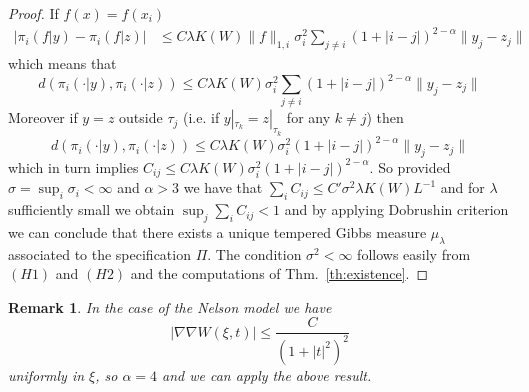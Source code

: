 \documentclass[a4paper,12pt,reqno]{amsart}
\newtheorem{corollary}[theorem]{Corollary}
\newtheorem{remark}[theorem]{Remark}
\begin{document}
\begin{proof}
If $f(x) = f(x_i)$
\begin{equation*}
  \begin{split}
 \left|\pi_i(f|y)-\pi_i(f|z)\right| & \le 
 C \lambda K(W)  \|f\|_{1,i}  \sigma_i^2 \sum_{j \neq i} 
   (1+|i-j|)^{2-\alpha}  \|y_j-z_j\| 
  \end{split}
\end{equation*}
which means that
\begin{equation}
d(\pi_i(\cdot|y),\pi_i(\cdot|z)) \le C\lambda K(W)   \sigma_i^2   \sum_{j \neq i} 
   (1+|i-j|)^{2-\alpha}  \|y_j-z_j\|  
\end{equation}
Moreover if $y=z$ outside $\tau_j$ (i.e. if $y|_{\tau_k} = z|_{\tau_k}$ for any $k \neq j$) then 
\begin{equation}
d(\pi_i(\cdot|y),\pi_i(\cdot|z)) \le C \lambda K(W) \sigma_i^2    
   (1+|i-j|)^{2-\alpha}  \|y_j-z_j\|  
\end{equation}
which in turn implies
$
C_{ij} \le C  \lambda K(W)  \sigma_i^2 
   (1+|i-j|)^{2-\alpha}.  
$
So provided 
$
\sigma = \sup_i \sigma_i < \infty 
$
and $\alpha > 3$
we have that $\sum_i C_{ij} \le C' \sigma^2 \lambda K(W) L^{-1}$ and for $\lambda$ sufficiently small we obtain $\sup_j \sum_{i} C_{ij} < 1$ and by applying Dobrushin criterion we can conclude that
 there exists a unique
tempered Gibbs measure $\mu_\lambda$ associated to the specification $\Pi$.
The condition $\sigma^2 < \infty$ follows easily from $(H1)$ and $(H2)$ and the computations of Thm.~\ref{th:existence}.
\end{proof}

\begin{remark}
In the case of the Nelson model we have
$$
|\nabla \nabla W(\xi,t)| \le \frac{C}{(1+|t|^2)^2}
$$  
uniformly in $\xi$, so $\alpha = 4$ and we can apply the above result.
\end{remark}

\end{document}

